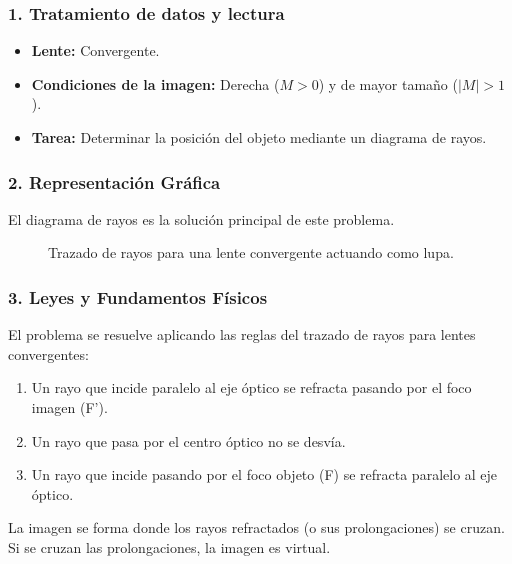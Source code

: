 \subsubsection*{1. Tratamiento de datos y lectura}
\begin{itemize}
    \item \textbf{Lente:} Convergente.
    \item \textbf{Condiciones de la imagen:} Derecha ($M>0$) y de mayor tamaño ($|M|>1$).
    \item \textbf{Tarea:} Determinar la posición del objeto mediante un diagrama de rayos.
\end{itemize}
\subsubsection*{2. Representación Gráfica}
El diagrama de rayos es la solución principal de este problema.
\begin{figure}[H]
    \centering
    \caption{Trazado de rayos para una lente convergente actuando como lupa.}
\end{figure}
\subsubsection*{3. Leyes y Fundamentos Físicos}
El problema se resuelve aplicando las reglas del trazado de rayos para lentes convergentes:
\begin{enumerate}
    \item Un rayo que incide paralelo al eje óptico se refracta pasando por el foco imagen (F').
    \item Un rayo que pasa por el centro óptico no se desvía.
    \item Un rayo que incide pasando por el foco objeto (F) se refracta paralelo al eje óptico.
\end{enumerate}
La imagen se forma donde los rayos refractados (o sus prolongaciones) se cruzan. Si se cruzan las prolongaciones, la imagen es virtual.

